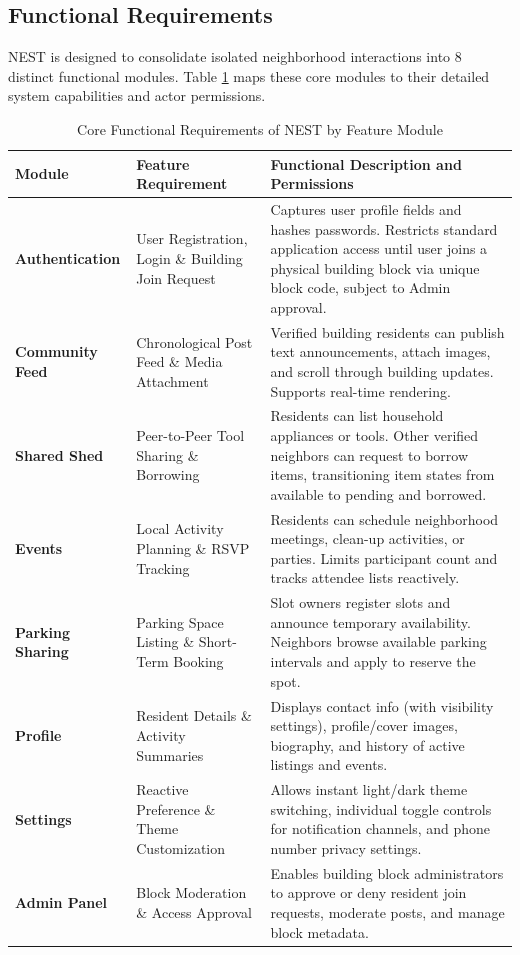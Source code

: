 \subsection{Functional Requirements}
NEST is designed to consolidate isolated neighborhood interactions into 8 distinct functional modules. Table \ref{tab:functional-requirements-full} maps these core modules to their detailed system capabilities and actor permissions.

\begin{table}[htbp]
\centering
\small
\setlength{\tabcolsep}{4pt}
\renewcommand{\arraystretch}{1.3}
\begin{tabularx}{\textwidth}{|>{\raggedright\arraybackslash}p{2.0cm}|>{\raggedright\arraybackslash}p{2.8cm}|>{\raggedright\arraybackslash}X|}
\hline
\textbf{Module} & \textbf{Feature Requirement} & \textbf{Functional Description and Permissions} \\ \hline
\textbf{Authen\-tication} & User Registration, Login \& Building Join Request & Captures user profile fields and hashes passwords. Restricts standard application access until user joins a physical building block via unique block code, subject to Admin approval. \\ \hline
\textbf{Community Feed} & Chronological Post Feed \& Media Attachment & Verified building residents can publish text announcements, attach images, and scroll through building updates. Supports real-time rendering. \\ \hline
\textbf{Shared Shed} & Peer-to-Peer Tool Sharing \& Borrowing & Residents can list household appliances or tools. Other verified neighbors can request to borrow items, transitioning item states from available to pending and borrowed. \\ \hline
\textbf{Events} & Local Activity Planning \& RSVP Tracking & Residents can schedule neighborhood meetings, clean-up activities, or parties. Limits participant count and tracks attendee lists reactively. \\ \hline
\textbf{Parking Sharing} & Parking Space Listing \& Short-Term Booking & Slot owners register slots and announce temporary availability. Neighbors browse available parking intervals and apply to reserve the spot. \\ \hline
\textbf{Profile} & Resident Details \& Activity Summaries & Displays contact info (with visibility settings), profile/cover images, biography, and history of active listings and events. \\ \hline
\textbf{Settings} & Reactive Preference \& Theme Customization & Allows instant light/dark theme switching, individual toggle controls for notification channels, and phone number privacy settings. \\ \hline
\textbf{Admin Panel} & Block Moderation \& Access Approval & Enables building block administrators to approve or deny resident join requests, moderate posts, and manage block metadata. \\ \hline
\end{tabularx}
\caption{Core Functional Requirements of NEST by Feature Module}
\label{tab:functional-requirements-full}
\end{table}

